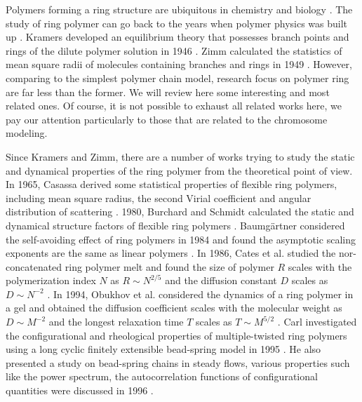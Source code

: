 Polymers forming a ring structure are ubiquitous in chemistry and biology \cite{Halverson2014,Richter2015}. The study of ring polymer can go back to the years when polymer physics was built up \cite{Kramers1946,Zimm1949}. Kramers developed an equilibrium theory that possesses branch points and rings of the dilute polymer solution in 1946 \cite{Kramers1946}. Zimm calculated the statistics of mean square radii of molecules containing branches and rings in 1949 \cite{Zimm1949}. However, comparing to the simplest polymer chain model, research focus on polymer ring are far less than the former. We will review here some interesting and most related ones. Of course, it is not possible to exhaust all related works here, we pay our attention particularly to those that are related to the chromosome modeling.

Since Kramers and Zimm, there are a number of works trying to study the static and dynamical properties of the ring polymer from the theoretical point of view.
In 1965, Casassa derived some statistical properties of flexible ring polymers, including mean square radius, the second Virial coefficient and angular distribution of scattering \cite{Casassa1965}. 1980, Burchard and Schmidt calculated the static and dynamical structure factors of flexible ring polymers \cite{Burchard1980}. Baumg\"{a}rtner considered the self-avoiding effect of ring polymers in 1984 and found the asymptotic scaling exponents are the same as linear polymers \cite{Baumgartner1982a}. In 1986, Cates et al. studied the nor-concatenated ring polymer melt and found the size of polymer $R$ scales with the polymerization index $N$ as $R\sim N^{2/5}$ and the diffusion constant $D$ scales as $D\sim N^{-2}$ \cite{Cates1986}.  In 1994, Obukhov et al. considered the dynamics of a ring polymer in a gel and obtained the diffusion coefficient scales with the molecular weight as $D\sim M^{-2}$ and the longest relaxation time $T$ scales as $T\sim M^{5/2}$ \cite{Obukhov1994}. Carl investigated the configurational and rheological properties of multiple-twisted ring polymers using a long cyclic finitely extensible bead-spring model in 1995 \cite{Carl1995}. He also presented a study on bead-spring chains in steady flows, various properties such like the power spectrum, the autocorrelation functions of configurational quantities were discussed in 1996 \cite{Carl1996}.
